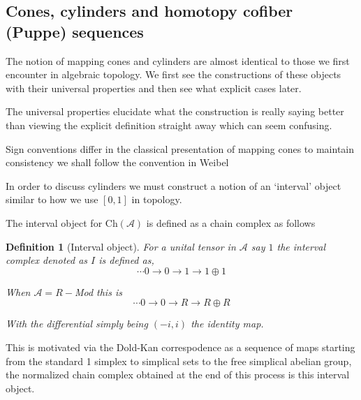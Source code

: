 \documentclass[12pt]{article}
\numberwithin{equation}{section}
\newtheorem{definition}{Definition}[section]
\begin{document}
	
	
	\subsection{Cones, cylinders and homotopy cofiber (Puppe) sequences}
	
	
	The notion of mapping cones and cylinders are almost identical to those we first encounter in algebraic topology. We first see the constructions of these objects with their universal properties and then see what explicit cases later.
	
	The universal properties elucidate what the construction is really saying better than viewing the explicit definition straight away which can seem confusing.
	
		Sign conventions differ in the classical presentation of mapping cones to maintain consistency we shall follow the convention in Weibel \cite{weibel_1994}

	In order to discuss cylinders we must construct a notion of an `interval' object similar to how we use $[0,1]$ in topology.
	
	
	The interval object for $\mathrm{Ch}(\mathcal{A})$ is defined as a chain complex as follows
	\begin{definition}[Interval object]
		For a unital tensor in $\mathcal{A}$ say $1$ the interval complex denoted as $I$ is defined as,
		\[ \cdots 0 \to 0 \to 1 \to 1 \oplus 1 \]
		
		When $\mathcal{A}=R-$Mod this is 
		\[ \cdots 0 \to 0 \to R \to R \oplus R \]
		
		With the differential simply being $(-i,i)$ the identity map.
	\end{definition}
	
	This is motivated via the Dold-Kan correspodence as a sequence of maps starting from the standard 1 simplex to simplical sets to the free simplical abelian group, the normalized chain complex obtained at the end of this process is this interval object.
	
\end{document}
